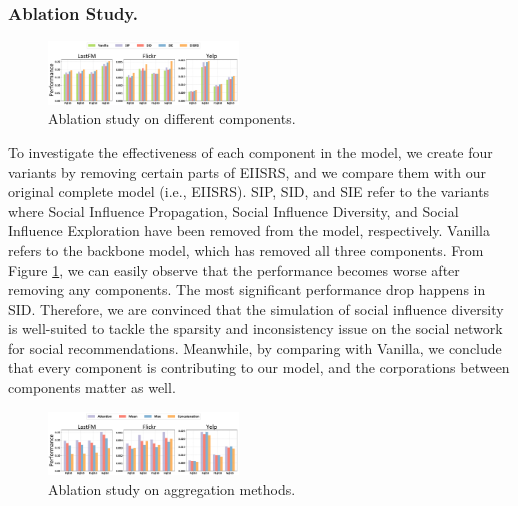\documentclass[letterpaper]{article} %
\begin{document}
\subsubsection{Ablation Study.}
\begin{figure}[ht!]
  \centering
  \includegraphics[width=0.45\textwidth]{ablation.pdf} %
  \caption{Ablation study on different components.}
  \label{fig_ablation}
\end{figure}
To investigate the effectiveness of each component in the model, we create four variants by removing certain parts of EIISRS, and we compare them with our original complete model (i.e., EIISRS). SIP, SID, and SIE refer to the variants where Social Influence Propagation, Social Influence Diversity, and Social Influence Exploration have been removed from the model, respectively. Vanilla refers to the backbone model, which has removed all three components. From Figure \ref{fig_ablation}, we can easily observe that the performance becomes worse after removing any components. The most significant performance drop happens in SID. Therefore, we are convinced that the simulation of social influence diversity is well-suited to tackle the sparsity and inconsistency issue on the social network for social recommendations. Meanwhile, by comparing with Vanilla, we conclude that every component is contributing to our model, and the corporations between components matter as well.
\begin{figure}[ht!]
  \centering
  \includegraphics[width=0.45\textwidth]{agg.pdf} %
  \caption{Ablation study on aggregation methods.}
  \label{fig_agg}
\end{figure}
\end{document}
